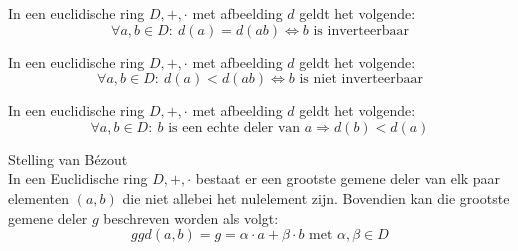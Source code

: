 \documentclass[main.tex]{subfiles}
\begin{document}
\begin{st}
  In een euclidische ring $D,+,\cdot$ met afbeelding $d$ geldt het volgende:
  \[ \forall a,b \in D:\ d(a) = d(ab) \Leftrightarrow b \text{ is inverteerbaar} \]
\end{st}

\begin{st}
  In een euclidische ring $D,+,\cdot$ met afbeelding $d$ geldt het volgende:
  \[ \forall a,b \in D:\ d(a) < d(ab) \Leftrightarrow b \text{ is niet inverteerbaar} \]
\end{st}

\begin{st}
  In een euclidische ring $D,+,\cdot$ met afbeelding $d$ geldt het volgende:
  \[ \forall a,b \in D:\ b \text{ is een echte deler van } a \Rightarrow d(b) < d(a) \]
\end{st}

\begin{st}
  Stelling van B\'ezout\\
  In een Euclidische ring $D,+,\cdot$ bestaat er een grootste gemene deler van elk paar elementen $(a,b)$ die niet allebei het nulelement zijn.
  Bovendien kan die grootste gemene deler $g$ beschreven worden als volgt:
  \[ ggd(a,b) = g = \alpha \cdot a + \beta \cdot b \text{ met }\alpha,\beta \in D \]
\end{st}

\end{document}
